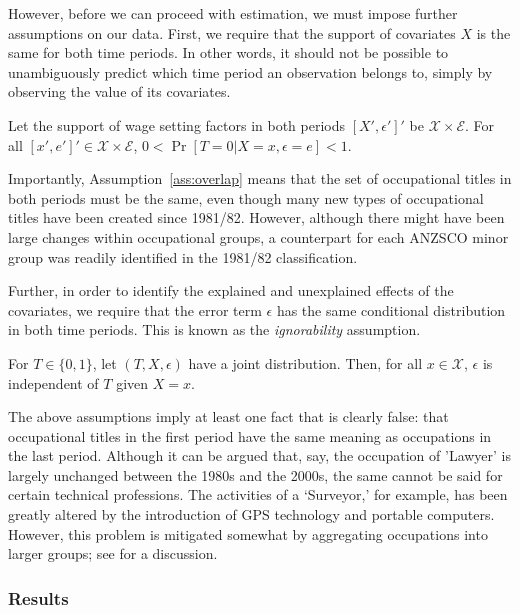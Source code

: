 However, before we can proceed with estimation, we must impose further assumptions on our data. First, we require that the support of covariates $X$ is the same for both time periods. In other words, it should not be possible to unambiguously predict which time period an observation belongs to, simply by observing the value of its covariates. 
\begin{assumption} \label{ass:overlap}
  Let the support of wage setting factors in both periods $[X',\epsilon']'$ be $\mathcal{X}\times\mathcal{E}$. For all $[x',e']' \in \mathcal{X}\times\mathcal{E}$,  $0 < \Pr[T=0 | X=x, \epsilon=e] < 1$.
\end{assumption}
Importantly, Assumption~\ref{ass:overlap} means that the set of occupational titles in both periods must be the same, even though many new types of occupational titles have been created since 1981/82. However, although there might have been large changes within occupational groups, a counterpart for each ANZSCO minor group was readily identified in the 1981/82 classification.

Further, in order to identify the explained and unexplained effects of the covariates, we require that the error term $\epsilon$ has the same conditional distribution in both time periods. This is known as the {\em ignorability} assumption.
\begin{assumption}[Ignorability]
  For $T\in\{0,1\}$, let $(T, X, \epsilon)$ have a joint distribution. Then, for all $x\in \mathcal{X}$, $\epsilon$ is independent of $T$ given $X=x$.
\end{assumption}

The above assumptions imply at least one fact that is clearly false: that occupational titles in the first period have the same meaning as occupations in the last period. Although it can be argued that, say, the occupation of 'Lawyer' is largely unchanged between the 1980s and the 2000s, the same cannot be said for certain technical professions. The activities of a `Surveyor,' for example, has been greatly altered by the introduction of GPS technology and portable computers. However, this problem is mitigated somewhat by aggregating occupations into larger groups; see \citet{Firpo2011} for a discussion.

\subsubsection{Results}

